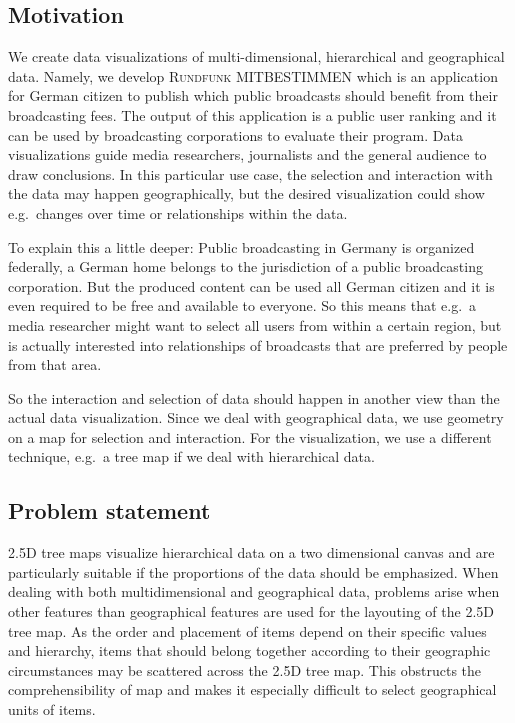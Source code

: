 \documentclass{article}
\newcommand{\rufu}{\textsc{Rundfunk MITBESTIMMEN}}
\newcommand{\tmap}{\textsc{2.5D} tree map}
\newcommand{\tmaps}{\textsc{2.5D} tree maps}
\begin{document}

\subsection{Motivation}\label{sec:outline}

We create data visualizations of multi-dimensional, hierarchical and geographical data.
Namely, we develop \rufu{} which is an application for German citizen to publish which public broadcasts should benefit from their broadcasting fees.
The output of this application is a public user ranking and it can be used by broadcasting corporations to evaluate their program.
Data visualizations guide media researchers, journalists and the general audience to draw conclusions.
In this particular use case, the selection and interaction with the data may happen geographically, but the desired visualization could show e.g.\ changes over time or relationships within the data.

To explain this a little deeper:
Public broadcasting in Germany is organized federally, a German home belongs to the jurisdiction of a public broadcasting corporation.
But the produced content can be used all German citizen and it is even required to be free and available to everyone.
So this means that e.g.\ a media researcher might want to select all users from within a certain region, but is actually interested into relationships of broadcasts that are preferred by people from that area.

So the interaction and selection of data should happen in another view than the actual data visualization.
Since we deal with geographical data, we use geometry on a map for selection and interaction.
For the visualization, we use a different technique, e.g.\ a tree map if we deal with hierarchical data.


\subsection{Problem statement}


\tmaps{} visualize hierarchical data on a two dimensional canvas and are particularly suitable if the proportions of the data should be emphasized.
When dealing with both multidimensional and geographical data, problems arise when other features than geographical features are used for the layouting of the \tmap{}.
As the order and placement of items depend on their specific values and hierarchy, items that should belong together according to their geographic circumstances may be scattered across the \tmap{}.
This obstructs the comprehensibility of map and makes it especially difficult to select geographical units of items.
\end{document}
